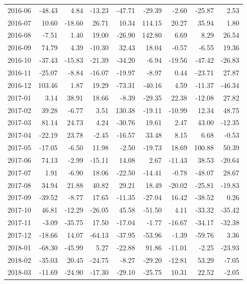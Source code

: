 \begin{table}[ht]
\begin{tabular}{lrrrrrrrr}
  2016-06 & -48.43 & 4.84 & -13.23 & -47.71 & -29.39 & -2.60 & -25.87 & 2.53 \\ 
  2016-07 & 10.60 & -18.60 & 26.71 & 10.34 & 114.15 & 20.27 & 35.94 & 1.80 \\ 
  2016-08 & -7.51 & 1.40 & 19.00 & -26.90 & 142.80 & 6.69 & 8.29 & 26.54 \\ 
  2016-09 & 74.79 & 4.39 & -10.30 & 32.43 & 18.04 & -0.57 & -6.55 & 19.36 \\ 
  2016-10 & -37.43 & -15.83 & -21.39 & -34.20 & -6.94 & -19.56 & -47.42 & -26.83 \\ 
  2016-11 & -25.07 & -8.84 & -16.07 & -19.97 & -8.97 & 0.44 & -23.71 & 27.87 \\ 
  2016-12 & 103.46 & 1.87 & 19.29 & -73.31 & -40.16 & 4.59 & -11.37 & -46.34 \\ 
  2017-01 & 3.14 & 38.91 & 18.66 & -8.39 & -29.35 & 22.38 & -12.08 & 27.82 \\ 
  2017-02 & 39.28 & -6.77 & 3.51 & 130.38 & -19.11 & -10.99 & 12.34 & 48.75 \\ 
  2017-03 & 81.14 & 24.73 & 4.24 & -30.76 & 19.61 & 2.47 & 43.00 & -12.35 \\ 
  2017-04 & -22.19 & 23.78 & -2.45 & -16.57 & 33.48 & 8.15 & 6.68 & -0.53 \\ 
  2017-05 & -17.05 & -6.50 & 11.98 & -2.50 & -19.73 & 18.69 & 100.88 & 50.39 \\ 
  2017-06 & 74.13 & -2.99 & -15.11 & 14.08 & 2.67 & -11.43 & 38.53 & -20.64 \\ 
  2017-07 & 1.91 & -6.90 & 18.06 & -22.50 & -14.41 & -0.78 & -48.07 & 28.67 \\ 
  2017-08 & 34.94 & 21.88 & 40.82 & 29.21 & 18.49 & -20.02 & -25.81 & -19.83 \\ 
  2017-09 & -39.52 & -8.77 & 17.65 & -11.35 & -27.04 & 16.42 & -38.52 & 0.26 \\ 
  2017-10 & 46.81 & -12.29 & -26.05 & 45.58 & -51.50 & 4.11 & -33.32 & -35.42 \\ 
  2017-11 & -3.09 & -35.75 & 17.50 & -17.04 & -1.77 & -16.67 & -34.17 & -32.38 \\ 
  2017-12 & -18.66 & 14.07 & -64.13 & -37.95 & -53.96 & -1.39 & -59.76 & 3.36 \\ 
  2018-01 & -68.30 & -45.99 & 5.27 & -22.88 & 91.86 & -11.01 & -2.25 & -23.93 \\ 
  2018-02 & -35.03 & 20.45 & -24.75 & -8.27 & -29.20 & -12.81 & 53.29 & -7.05 \\ 
  2018-03 & -11.69 & -24.90 & -17.30 & -29.10 & -25.75 & 10.31 & 22.52 & -2.05 \\ 

\end{tabular}
\end{table}
